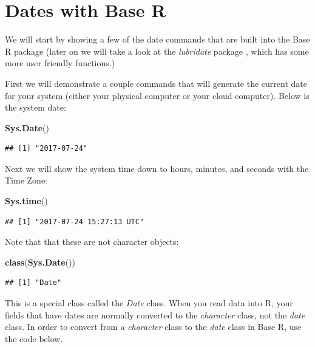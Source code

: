 \documentclass[]{book}
\newenvironment{Shaded}{\begin{snugshade}}{\end{snugshade}}
\newcommand{\KeywordTok}[1]{\textcolor[rgb]{0.13,0.29,0.53}{\textbf{{#1}}}}
\newcommand{\NormalTok}[1]{{#1}}
\begin{document}
\section{Dates with Base R}\label{dates-with-base-r}

We will start by showing a few of the date commands that are built into
the Base R package (later on we will take a look at the \emph{lubridate}
package \citep{R-lubridate}, which has some more user friendly
functions.)

First we will demonstrate a couple commands that will generate the
current date for your system (either your physical computer or your
cloud computer). Below is the system date:

\begin{Shaded}
\begin{Highlighting}[]
\KeywordTok{Sys.Date}\NormalTok{()}
\end{Highlighting}
\end{Shaded}

\begin{verbatim}
## [1] "2017-07-24"
\end{verbatim}

Next we will show the system time down to hours, minutes, and seconds
with the Time Zone:

\begin{Shaded}
\begin{Highlighting}[]
\KeywordTok{Sys.time}\NormalTok{()}
\end{Highlighting}
\end{Shaded}

\begin{verbatim}
## [1] "2017-07-24 15:27:13 UTC"
\end{verbatim}

Note that that these are not character objects:

\begin{Shaded}
\begin{Highlighting}[]
\KeywordTok{class}\NormalTok{(}\KeywordTok{Sys.Date}\NormalTok{())}
\end{Highlighting}
\end{Shaded}

\begin{verbatim}
## [1] "Date"
\end{verbatim}

This is a special class called the \emph{Date} class. When you read data
into R, your fields that have dates are normally converted to the
\emph{character} class, not the \emph{date} class. In order to convert
from a \emph{character} class to the \emph{date} class in Base R, use
the code below.
\end{document}

